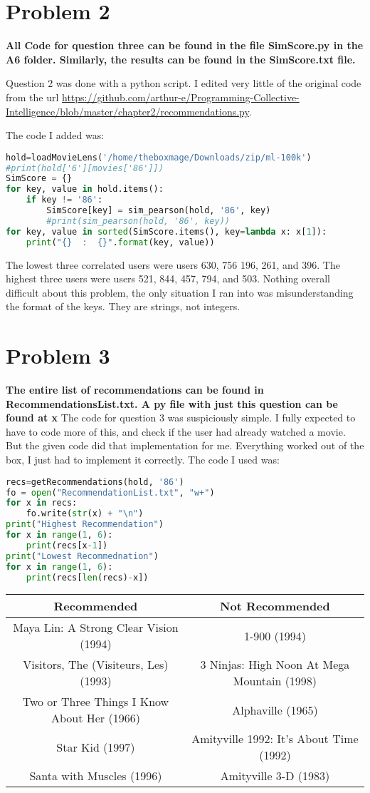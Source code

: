 \documentclass[11pt]{report}
\begin{document}
\section{Problem 2}
\textbf{All Code for question three can be found in the file SimScore.py in the A6 folder. Similarly, the results can be found in the SimScore.txt file.}

Question 2 was done with a python script. I edited very little of the original code from the url \url{https://github.com/arthur-e/Programming-Collective-Intelligence/blob/master/chapter2/recommendations.py}. 

The code I added was:
 
\begin{lstlisting}[language=python,caption={Sort by Recommendations}]
hold=loadMovieLens('/home/theboxmage/Downloads/zip/ml-100k')
#print(hold['6'][movies['86']])
SimScore = {}
for key, value in hold.items():
    if key != '86':
        SimScore[key] = sim_pearson(hold, '86', key)
        #print(sim_pearson(hold, '86', key))
for key, value in sorted(SimScore.items(), key=lambda x: x[1]):
    print("{}  :  {}".format(key, value))
\end{lstlisting}

The lowest three correlated users were users 630, 756 196, 261, and 396. The highest three users were users 521, 844, 457, 794, and 503. Nothing overall difficult about this problem, the only situation I ran into was misunderstanding the format of the keys. They are strings, not integers.
\pagebreak
\section{Problem 3}
\textbf{The entire list of recommendations can be found in RecommendationsList.txt. A py file with just this question can be found at x}
The code for question 3 was suspiciously simple. I fully expected to have to code more of this, and check if the user had already watched a movie. But the given code did that implementation for me. Everything worked out of the box, I just had to implement it correctly. The code I used was:
\begin{lstlisting}[language=python,caption={Sort by Expected Rating}]
recs=getRecommendations(hold, '86')
fo = open("RecommendationList.txt", "w+")
for x in recs:
    fo.write(str(x) + "\n")
print("Highest Recommendation")
for x in range(1, 6):
    print(recs[x-1])
print("Lowest Recommednation")
for x in range(1, 6):
    print(recs[len(recs)-x])
\end{lstlisting}
\begin{tabular}{|c|c|}
\hline
 Recommended & Not Recommended \\ \hline
\hline
Maya Lin: A Strong Clear Vision (1994) & 1-900 (1994)\\ \hline
Visitors, The (Visiteurs, Les) (1993) & 3 Ninjas: High Noon At Mega Mountain (1998)\\ \hline
Two or Three Things I Know About Her (1966) & Alphaville (1965)\\ \hline
Star Kid (1997) & Amityville 1992: It's About Time (1992)\\ \hline
Santa with Muscles (1996) & Amityville 3-D (1983)\\ \hline
\end{tabular}
\end{document}
